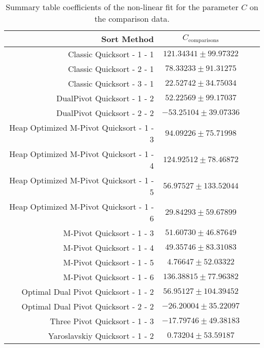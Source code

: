 	\begin{table}
		\begin{center}
			\begin{tabular}{|r|c|c|c}
				\hline
								Sort Method              &   $C_{\text{comparisons}}$      \\ \hline \hline
				                Classic Quicksort - 1 - 1 &  $ 121.34341 \pm  99.97322$ \\ \hline
				                Classic Quicksort - 2 - 1 &  $  78.33233 \pm  91.31275$ \\ \hline
				                Classic Quicksort - 3 - 1 &  $  22.52742 \pm  34.75034$ \\ \hline
				              DualPivot Quicksort - 1 - 2 &  $  52.22569 \pm  99.17037$ \\ \hline
				              DualPivot Quicksort - 2 - 2 &  $ -53.25104 \pm  39.07336$ \\ \hline
				 Heap Optimized M-Pivot Quicksort - 1 - 3 &  $  94.09226 \pm  75.71998$ \\ \hline
				 Heap Optimized M-Pivot Quicksort - 1 - 4 &  $ 124.92512 \pm  78.46872$ \\ \hline
				 Heap Optimized M-Pivot Quicksort - 1 - 5 &  $  56.97527 \pm 133.52044$ \\ \hline
				 Heap Optimized M-Pivot Quicksort - 1 - 6 &  $  29.84293 \pm  59.67899$ \\ \hline
				                M-Pivot Quicksort - 1 - 3 &  $  51.60730 \pm  46.87649$ \\ \hline
				                M-Pivot Quicksort - 1 - 4 &  $  49.35746 \pm  83.31083$ \\ \hline
				                M-Pivot Quicksort - 1 - 5 &  $   4.76647 \pm  52.03322$ \\ \hline
				                M-Pivot Quicksort - 1 - 6 &  $ 136.38815 \pm  77.96382$ \\ \hline
				     Optimal Dual Pivot Quicksort - 1 - 2 &  $  56.95127 \pm 104.39452$ \\ \hline
				     Optimal Dual Pivot Quicksort - 2 - 2 &  $ -26.20004 \pm  35.22097$ \\ \hline
				            Three Pivot Quicksort - 1 - 3 &  $ -17.79746 \pm  49.38183$ \\ \hline
				           Yaroslavskiy Quicksort - 1 - 2 &  $   0.73204 \pm  53.59187$ \\ \hline
			\end{tabular}
			\caption{Summary table coefficients of the non-linear fit for the parameter $C$ on the comparison data.}
			\label{tab:compFitCoeffC}
		\end{center}
	\end{table}



